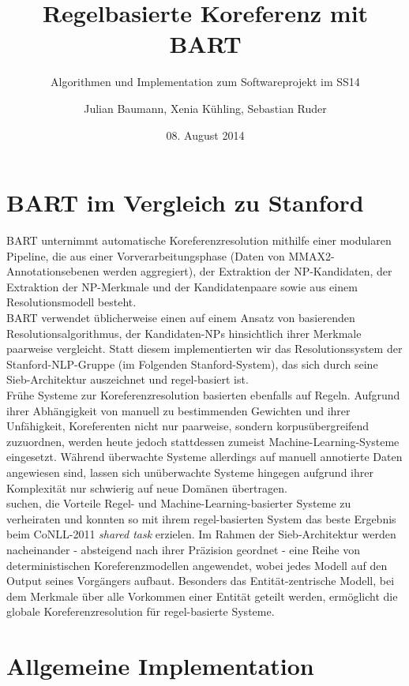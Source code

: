 \documentclass{scrartcl}
\author{Julian Baumann, Xenia Kühling, Sebastian Ruder}
\date{08. August 2014}
\title{Regelbasierte Koreferenz mit BART}
\subtitle{Algorithmen und Implementation zum Softwareprojekt im SS14}
\begin{document}
\maketitle
\section{BART im Vergleich zu Stanford}

BART unternimmt automatische Koreferenzresolution mithilfe einer modularen Pipeline, die aus einer Vorverarbeitungsphase (Daten von MMAX2-Annotationsebenen werden aggregiert), der Extraktion der NP-Kandidaten, der Extraktion der NP-Merkmale und der Kandidatenpaare sowie aus einem Resolutionsmodell besteht.\\
BART verwendet üblicherweise einen auf einem Ansatz von  basierenden Resolutionsalgorithmus, der Kandidaten-NPs hinsichtlich ihrer Merkmale paarweise vergleicht. Statt diesem implementierten wir das Resolutionssystem der Stanford-NLP-Gruppe (im Folgenden Stanford-System), das sich durch seine Sieb-Architektur auszeichnet und regel-basiert ist.\\
Frühe Systeme zur Koreferenzresolution basierten ebenfalls auf Regeln. Aufgrund ihrer Abhängigkeit von manuell zu bestimmenden Gewichten und ihrer Unfähigkeit, Koreferenten nicht nur paarweise, sondern korpusübergreifend zuzuordnen, werden heute jedoch stattdessen zumeist Machine-Learning-Systeme eingesetzt. Während überwachte Systeme allerdings auf manuell annotierte Daten angewiesen sind, lassen sich unüberwachte Systeme hingegen aufgrund ihrer Komplexität nur schwierig auf neue Domänen übertragen.\\
 suchen, die Vorteile Regel- und Machine-Learning-basierter Systeme zu verheiraten und konnten so mit ihrem regel-basierten System das beste Ergebnis beim CoNLL-2011 \textit{shared task} erzielen. Im Rahmen der Sieb-Architektur werden nacheinander - absteigend nach ihrer Präzision geordnet - eine Reihe von deterministischen Koreferenzmodellen angewendet, wobei jedes Modell auf den Output seines Vorgängers aufbaut. Besonders das Entität-zentrische Modell, bei dem Merkmale über alle Vorkommen einer Entität geteilt werden, ermöglicht die globale Koreferenzresolution für regel-basierte Systeme.

\section{Allgemeine Implementation}
\end{document}
